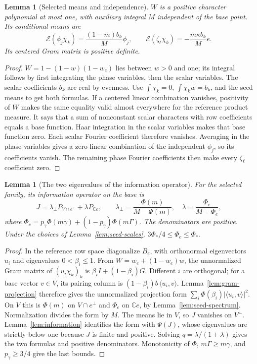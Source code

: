 \documentclass[reqno,a4paper,12pt]{amsart}
\newtheorem{lemma}[theorem]{Lemma}
\theoremstyle{definition}
\newcommand{\C}{\mathbb C}
\newcommand{\ip}[2]{\langle #1,#2\rangle}
\begin{document}
\begin{lemma}[Selected means and independence]\label{lem:selected-means}
$W$ is a positive character polynomial at most one, with auxiliary
integral $M$ independent of the base point. Its conditional means are
\[
 \mathcal E(\phi_j\chi_k)=\frac{(1-m)b_k}{M}\phi_j,\qquad
 \mathcal E(\zeta_\ell\chi_k)=-\frac{m\kappa b_k}{M}e.
\]
Its centered Gram matrix is positive definite.
\end{lemma}
\begin{proof}
$W=1-(1-w)(1-w_e)$ lies between $w>0$ and one; its integral follows
by first integrating the phase variables, then the scalar variables.
The scalar coefficients $b_k$ are real by evenness.
Use $\int\chi_k=0$, $\int\chi_kw=b_k$, and the seed means to get both
formulas.
If a centered linear combination vanishes, positivity of $W$ makes
the same equality valid almost everywhere for the reference product
measure. It says that a sum of nonconstant scalar characters with
row coefficients equals a base function. Haar integration in the
scalar variables makes that base function zero. Each scalar Fourier
coefficient therefore vanishes. Averaging in the phase variables
gives a zero linear combination of the independent $\phi_j$, so its
coefficients vanish. The remaining phase Fourier coefficients then
make every $\zeta_\ell$ coefficient zero.
\end{proof}

\begin{lemma}[The two eigenvalues of the information operator]
\label{lem:selected-information}
For the selected family, its information operator on the base is
\[
 J=\lambda_\perp P_{V\cap e^\perp}+\lambda P_{\C e},\qquad
 \lambda_\perp=\frac{\Phi(m)}{M-\Phi(m)},\quad
 \lambda=\frac{\Phi_e}{M-\Phi_e},
\]
where
$\Phi_e=p_\gamma\Phi(m\gamma)+(1-p_\gamma)\Phi(m\Gamma)$.
The denominators are positive. Under the choices of
Lemma~\ref{lem:seed-scales}, $3\Phi_*/4\le\Phi_e\le\Phi_*$.
\end{lemma}
\begin{proof}
In the reference row space diagonalize $B_e$, with orthonormal
eigenvectors $u_i$ and eigenvalues $0<\beta_i\le1$.
From $W=w_e+(1-w_e)w$, the unnormalized Gram matrix of
$(u_i\chi_k)_k$ is $\beta_iI+(1-\beta_i)G$.
Different $i$ are orthogonal; for a base vector $v\in V$, its pairing
column is $(1-\beta_i)b\,\ip{u_i}{v}$.
Lemma~\ref{lem:gram-projection} therefore gives the unnormalized
projection form
$\sum_i\Phi(\beta_i)|\ip{u_i}{v}|^2$.
On $V$ this is $\Phi(m)$ on $V\cap e^\perp$ and $\Phi_e$ on $\C e$,
by Lemma~\ref{lem:seed-spectrum}.
Normalization divides the form by $M$. The means lie in $V$, so
$J$ vanishes on $V^\perp$. Lemma~\ref{lem:information} identifies
the form with $\Psi(J)$, whose eigenvalues are strictly below one
because $J$ is finite and positive. Solving $q=\lambda/(1+\lambda)$
gives the two formulas and positive denominators.
Monotonicity of $\Phi$, $m\Gamma\ge m\gamma$, and
$p_\gamma\ge3/4$ give the last bounds.
\end{proof}
\end{document}
